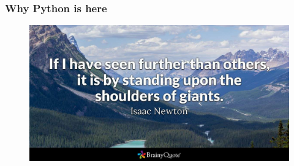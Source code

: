 \begin{frame}[fragile]
\frametitle{Why Python is here}
\begin{figure}
\includegraphics[width=0.8\linewidth]{isaacnewton1-2x}
\end{figure}
\end{frame}